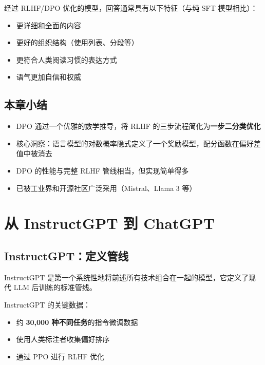 \documentclass[a4paper]{article}
\begin{document}



经过 RLHF/DPO 优化的模型，回答通常具有以下特征（与纯 SFT 模型相比）：
\begin{itemize}
    \item 更详细和全面的内容
    \item 更好的组织结构（使用列表、分段等）
    \item 更符合人类阅读习惯的表达方式
    \item 语气更加自信和权威
\end{itemize}

\subsection{本章小结}

\begin{itemize}
    \item DPO 通过一个优雅的数学推导，将 RLHF 的三步流程简化为\textbf{一步二分类优化}
    \item 核心洞察：语言模型的对数概率隐式定义了一个奖励模型，配分函数在偏好差值中被消去
    \item DPO 的性能与完整 RLHF 管线相当，但实现简单得多
    \item 已被工业界和开源社区广泛采用（Mistral、Llama 3 等）
\end{itemize}


\section{从 InstructGPT 到 ChatGPT}

\subsection{InstructGPT：定义管线}

InstructGPT 是第一个系统性地将前述所有技术组合在一起的模型，它定义了现代 LLM 后训练的标准管线。





InstructGPT 的关键数据：
\begin{itemize}
    \item 约 \textbf{30,000 种不同任务}的指令微调数据
    \item 使用人类标注者收集偏好排序
    \item 通过 PPO 进行 RLHF 优化
\end{itemize}
\end{document}
